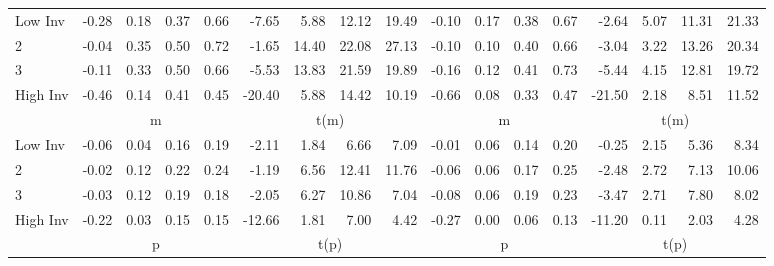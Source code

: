 \begin{table}[!ht]
\begin{tabular}{lrrrrrrrrrrrrrrrr}
    \\
      \cmidrule(r){2-5} \cmidrule(r){6-9} \cmidrule(r){10-13} \cmidrule(r){14-17}

    Low Inv   & -0.28  & 0.18  & 0.37  & 0.66  & -7.65  & 5.88  & 12.12  & 19.49  & -0.10  & 0.17  & 0.38  & 0.67  & -2.64  & 5.07  & 11.31  & 21.33  \\
           2  & -0.04  & 0.35  & 0.50  & 0.72  & -1.65  & 14.40  & 22.08  & 27.13  & -0.10  & 0.10  & 0.40  & 0.66  & -3.04  & 3.22  & 13.26  & 20.34  \\
           3  & -0.11  & 0.33  & 0.50  & 0.66  & -5.53  & 13.83  & 21.59  & 19.89  & -0.16  & 0.12  & 0.41  & 0.73  & -5.44  & 4.15  & 12.81  & 19.72  \\
    High Inv  & -0.46  & 0.14  & 0.41  & 0.45  & -20.40  & 5.88  & 14.42  & 10.19  & -0.66  & 0.08  & 0.33  & 0.47  & -21.50  & 2.18  & 8.51  & 11.52  \\

  
    
      & \multicolumn{4}{c}{m} & \multicolumn{4}{c}{t(m)}
    
      & \multicolumn{4}{c}{m} & \multicolumn{4}{c}{t(m)}
    
    \\
      \cmidrule(r){2-5} \cmidrule(r){6-9} \cmidrule(r){10-13} \cmidrule(r){14-17}

    Low Inv   & -0.06  & 0.04  & 0.16  & 0.19  & -2.11  & 1.84  & 6.66  & 7.09  & -0.01  & 0.06  & 0.14  & 0.20  & -0.25  & 2.15  & 5.36  & 8.34  \\
           2  & -0.02  & 0.12  & 0.22  & 0.24  & -1.19  & 6.56  & 12.41  & 11.76  & -0.06  & 0.06  & 0.17  & 0.25  & -2.48  & 2.72  & 7.13  & 10.06  \\
           3  & -0.03  & 0.12  & 0.19  & 0.18  & -2.05  & 6.27  & 10.86  & 7.04  & -0.08  & 0.06  & 0.19  & 0.23  & -3.47  & 2.71  & 7.80  & 8.02  \\
    High Inv  & -0.22  & 0.03  & 0.15  & 0.15  & -12.66  & 1.81  & 7.00  & 4.42  & -0.27  & 0.00  & 0.06  & 0.13  & -11.20  & 0.11  & 2.03  & 4.28  \\

  
    
      & \multicolumn{4}{c}{p} & \multicolumn{4}{c}{t(p)}
    
      & \multicolumn{4}{c}{p} & \multicolumn{4}{c}{t(p)}
    
    \\
      \cmidrule(r){2-5} \cmidrule(r){6-9} \cmidrule(r){10-13} \cmidrule(r){14-17}


\end{tabular}
\end{table}
